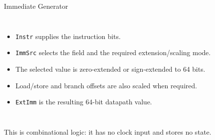 \documentclass[aspectratio=169,11pt,t]{beamer}
\newcommand{\code}[1]{\texttt{#1}}
\begin{document}
\begin{frame}{Immediate Generator}
\begin{columns}[T,onlytextwidth]
\begin{itemize}\setlength{\itemsep}{7pt}
  \item \code{Instr} supplies the instruction bits.
  \item \code{ImmSrc} selects the field and the required extension/scaling mode.
  \item The selected value is zero-extended or sign-extended to 64 bits.
  \item Load/store and branch offsets are also scaled when required.
  \item \code{ExtImm} is the resulting 64-bit datapath value.
\end{itemize}
\vspace{.5cm}
\begin{center}
\end{center}
\end{columns}
\vspace{.2cm}
This is combinational logic: it has no clock input and stores no state.
\end{frame}
\end{document}
